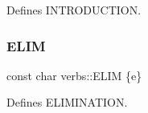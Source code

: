 Defines I\+N\+T\+R\+O\+D\+U\+C\+T\+I\+ON. 

\mbox{\label{namespaceverbs_ae28355cc9321ebee9abcd23bb6e1b836}} 
\subsubsection{\texorpdfstring{E\+L\+IM}{ELIM}}
{\footnotesize\ttfamily const char verbs\+::\+E\+L\+IM \{\textquotesingle{}e\textquotesingle{}\}}



Defines E\+L\+I\+M\+I\+N\+A\+T\+I\+ON. 

